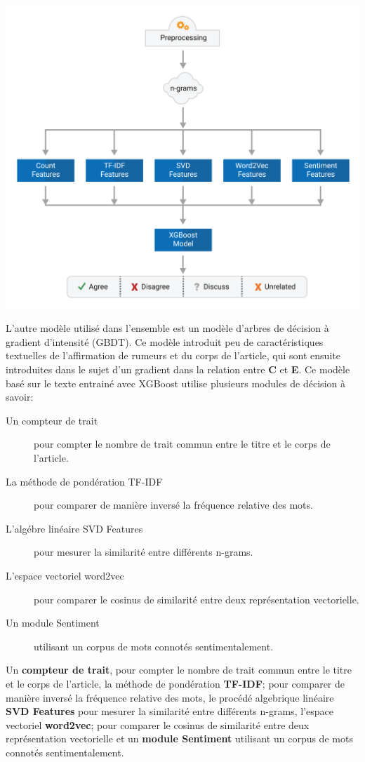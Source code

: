 \documentclass[11pt,a4paper,oldfontcommands]{memoir}
\begin{document}
\begin{center}
 \includegraphics[scale=0.5]{../../img/model/solat_in_the_swen/tree_model_light.png}
 \label{fig2}
\end{center}

L'autre modèle utilisé dans l'ensemble est un modèle d'arbres de décision à gradient d'intensité (GBDT).
Ce modèle introduit peu de caractéristiques textuelles de l'affirmation de rumeurs et du corps de l'article, qui sont ensuite introduites dans le sujet d'un gradient dans la relation entre \textbf{C} et \textbf{E}. Ce modèle basé sur le texte entrainé avec XGBoost utilise plusieurs modules de décision à savoir:
\begin{description}
 \item [Un compteur de trait] pour compter le nombre de trait commun entre le titre et le corps de l'article.
 \item [La méthode de pondération TF-IDF] pour comparer de manière inversé la fréquence relative des mots.
 \item [L'algébre linéaire SVD Features] pour mesurer la similarité entre différents n-grams.
 \item [L'espace vectoriel word2vec] pour comparer le cosinus de similarité entre deux représentation vectorielle.
 \item [Un module Sentiment] utilisant un corpus de mots connotés sentimentalement.
       
\end{description}
Un \textbf{compteur de trait}, pour compter le nombre de trait commun entre le titre et le corps de l'article, la méthode de pondération \textbf{TF-IDF}; pour comparer de manière inversé la fréquence relative des mots, le procédé algebrique linéaire \textbf{SVD Features} pour mesurer la similarité entre différents n-grams, l'espace vectoriel \textbf{word2vec}; pour comparer le cosinus de similarité entre deux représentation vectorielle et un \textbf{module Sentiment} utilisant un corpus de mots connotés sentimentalement.
\end{document}
